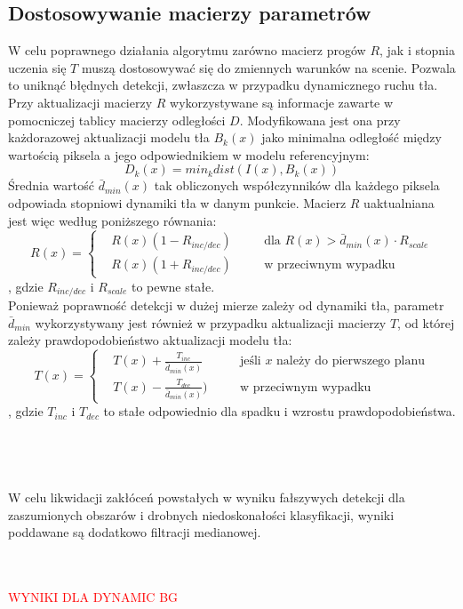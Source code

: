 \subsection{Dostosowywanie macierzy parametrów}
W celu poprawnego działania algorytmu zarówno macierz progów $R$, jak i stopnia uczenia się $T$ muszą dostosowywać się do zmiennych warunków na scenie. Pozwala to uniknąć błędnych detekcji, zwłaszcza w przypadku dynamicznego ruchu tła.\\
Przy aktualizacji macierzy $R$ wykorzystywane są informacje zawarte w pomocniczej tablicy macierzy odległości $D$. Modyfikowana jest ona przy każdorazowej aktualizacji modelu tła $B_{k}(x)$ jako minimalna odległość między wartością piksela a jego odpowiednikiem w modelu referencyjnym:
\begin{equation}
D_{k}(x)=min_{k}dist(I(x),B_{k}(x))
\end{equation}
Średnia wartość $\bar{d}_{min}(x)$ tak obliczonych współczynników dla każdego piksela odpowiada stopniowi dynamiki tła w danym punkcie. Macierz $R$ uaktualniana jest więc według poniższego równania:
\begin{equation}
R(x) = \left\{
\begin{split}
&R(x)(1-R_{inc/dec}) & \quad &\text{dla $R(x)>\bar{d}_{min}(x)\cdot R_{scale}$} \\
&R(x)(1+R_{inc/dec}) & \quad &\text{w przeciwnym wypadku}
\end{split}
\right.
\end{equation}
, gdzie $R_{inc/dec}$ i $R_{scale}$ to pewne stałe.\\
Ponieważ poprawność detekcji w dużej mierze zależy od dynamiki tła, parametr $\bar{d}_{min}$ wykorzystywany jest również w przypadku aktualizacji macierzy $T$, od której zależy prawdopodobieństwo aktualizacji modelu tła:
\begin{equation}
T(x) = \left\{
\begin{split}
&T(x)+\frac{T_{inc}}{\bar{d}_{min}(x)} & \quad &\text{jeśli $x$ należy do pierwszego planu} \\
&T(x)-\frac{T_{dec}}{\bar{d}_{min}(x)}) & \quad &\text{w przeciwnym wypadku}
\end{split}
\right.
\end{equation}
, gdzie $T_{inc}$ i $T_{dec}$ to stałe odpowiednio dla spadku i wzrostu prawdopodobieństwa.
\paragraph{\\ \\}
W celu likwidacji zakłóceń powstałych w wyniku fałszywych detekcji dla zaszumionych obszarów i drobnych niedoskonałości klasyfikacji, wyniki poddawane są dodatkowo filtracji medianowej.
\\ \\ \\
\begin{LARGE}
\textcolor{red}{WYNIKI DLA DYNAMIC BG}
\end{LARGE}
